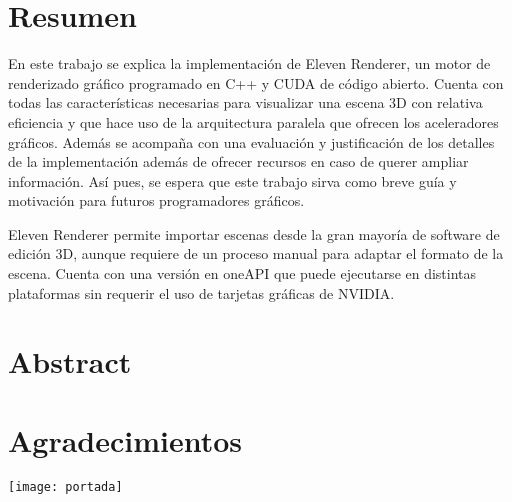 \chapter*{Resumen}

En este trabajo se explica la implementación de Eleven Renderer, un motor de renderizado gráfico programado en C++ y CUDA de código abierto. Cuenta con todas las características necesarias para visualizar una escena 3D con relativa eficiencia y que hace uso de la arquitectura paralela que ofrecen los aceleradores gráficos. Además se acompaña con una evaluación y justificación de los detalles de la implementación además de ofrecer recursos en caso de querer ampliar información. Así pues, se espera que este trabajo sirva como breve guía y motivación para futuros programadores gráficos.

Eleven Renderer permite importar escenas desde la gran mayoría de software de edición 3D, aunque requiere de un proceso manual para adaptar el formato de la escena. Cuenta con una versión en oneAPI que puede ejecutarse en distintas plataformas sin requerir el uso de tarjetas gráficas de NVIDIA.


\chapter*{Abstract}


\chapter*{Agradecimientos}


\newpage

\texttt{[image: portada]}

\scalebox{5}{\color{white}{Eleven Renderer}}

